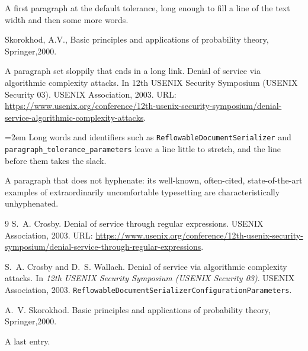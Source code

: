 \documentclass[12pt]{article}
\begin{document}
A first paragraph at the default tolerance, long enough to fill a line of the text width and then some more words.

{\sloppy Skorokhod, A.V., Basic principles and applications of probability theory, Springer,2000.\par}

{\sloppy A paragraph set sloppily that ends in a long link. Denial of service via algorithmic complexity attacks. In 12th USENIX Security Symposium (USENIX Security 03). USENIX Association, 2003. URL: \url{https://www.usenix.org/conference/12th-usenix-security-symposium/denial-service-algorithmic-complexity-attacks}.\par}

{\emergencystretch=2em Long words and identifiers such as \texttt{ReflowableDocumentSerializer} and \texttt{paragraph\_tolerance\_parameters} leave a line little to stretch, and the line before them takes the slack.\par}

{   A paragraph that does not hyphenate: its well-known, often-cited, state-of-the-art examples of extraordinarily uncomfortable typesetting are characteristically unhyphenated.\par}

\begin{thebibliography}{9}
S.~A. Crosby.
\newblock Denial of service through regular expressions.
\newblock USENIX Association, 2003.
\newblock URL:
  \url{https://www.usenix.org/conference/12th-usenix-security-symposium/denial-service-through-regular-expressions}.

S.~A. Crosby and D.~S. Wallach.
\newblock Denial of service via algorithmic complexity attacks.
\newblock In {\em 12th USENIX Security Symposium (USENIX Security 03)}. USENIX
  Association, 2003.
\newblock \texttt{ReflowableDocumentSerializerConfigurationParameters}.

A.~V. Skorokhod.
\newblock Basic principles and applications of probability theory, Springer,2000.

A last entry.
\end{thebibliography}
\end{document}
